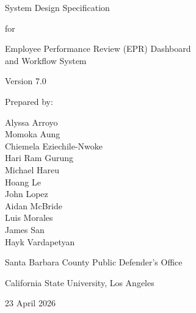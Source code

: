 \documentclass[12pt]{article}
\def\textbf#1{#1}%
\begin{document}

\begin{titlepage}
\centering
\vspace*{3cm}

{\LARGE \textbf{System Design Specification}\par}
\vspace{1.5cm}

{\large for\par}
\vspace{1cm}

{\LARGE \textbf{Employee Performance Review (EPR) Dashboard}\\
\LARGE \textbf{and Workflow System}\par}
\vspace{1.5cm}

{\normalsize Version 7.0\par}
\vspace{2cm}

{\normalsize Prepared by:\par}
\vspace{0.8cm}
{\normalsize
Alyssa Arroyo\\
Momoka Aung\\
Chiemela Eziechile-Nwoke\\
Hari Ram Gurung\\
Michael Hareu\\
Hoang Le\\
John Lopez\\
Aidan McBride\\
Luis Morales\\
James San\\
Hayk Vardapetyan\par}
\vspace{2cm}

{\normalsize Santa Barbara County Public Defender’s Office\par}
{\normalsize California State University, Los Angeles\par}

\vfill
{\normalsize 23 April 2026\par}

\end{titlepage}

\begingroup
\singlespacing
\setlength{\parskip}{0pt}
\setlength{\parindent}{0pt}
\tableofcontents
\endgroup
\end{document}

